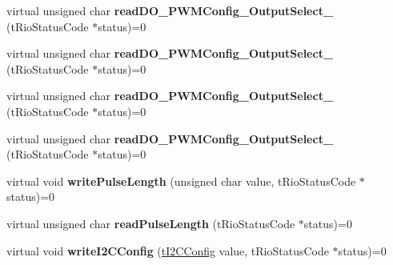\begin{DoxyCompactItemize}
\item 
\hypertarget{classnFPGA_1_1nFRC__2012__1__6__4_1_1tDIO_a1ba4c9385cc16312b5edd0fcf0cf9c97}{
virtual unsigned char {\bfseries readDO\_\-PWMConfig\_\-OutputSelect\_} (tRioStatusCode $\ast$status)=0}
\label{classnFPGA_1_1nFRC__2012__1__6__4_1_1tDIO_a1ba4c9385cc16312b5edd0fcf0cf9c97}

\item 
\hypertarget{classnFPGA_1_1nFRC__2012__1__6__4_1_1tDIO_a85caad19784a1f83f01643685ab0c4ee}{
virtual unsigned char {\bfseries readDO\_\-PWMConfig\_\-OutputSelect\_} (tRioStatusCode $\ast$status)=0}
\label{classnFPGA_1_1nFRC__2012__1__6__4_1_1tDIO_a85caad19784a1f83f01643685ab0c4ee}

\item 
\hypertarget{classnFPGA_1_1nFRC__2012__1__6__4_1_1tDIO_abec0ce72388b63c96df18cddc174aa37}{
virtual unsigned char {\bfseries readDO\_\-PWMConfig\_\-OutputSelect\_} (tRioStatusCode $\ast$status)=0}
\label{classnFPGA_1_1nFRC__2012__1__6__4_1_1tDIO_abec0ce72388b63c96df18cddc174aa37}

\item 
\hypertarget{classnFPGA_1_1nFRC__2012__1__6__4_1_1tDIO_a0653e38b8a28a43b42ad9627c2fc6c3a}{
virtual unsigned char {\bfseries readDO\_\-PWMConfig\_\-OutputSelect\_} (tRioStatusCode $\ast$status)=0}
\label{classnFPGA_1_1nFRC__2012__1__6__4_1_1tDIO_a0653e38b8a28a43b42ad9627c2fc6c3a}

\item 
\hypertarget{classnFPGA_1_1nFRC__2012__1__6__4_1_1tDIO_afb0552677b7031b72cc28c1d1600dab2}{
virtual void {\bfseries writePulseLength} (unsigned char value, tRioStatusCode $\ast$status)=0}
\label{classnFPGA_1_1nFRC__2012__1__6__4_1_1tDIO_afb0552677b7031b72cc28c1d1600dab2}

\item 
\hypertarget{classnFPGA_1_1nFRC__2012__1__6__4_1_1tDIO_a710d1f504174edc2e7e021edf6860d66}{
virtual unsigned char {\bfseries readPulseLength} (tRioStatusCode $\ast$status)=0}
\label{classnFPGA_1_1nFRC__2012__1__6__4_1_1tDIO_a710d1f504174edc2e7e021edf6860d66}

\item 
\hypertarget{classnFPGA_1_1nFRC__2012__1__6__4_1_1tDIO_a5e68eeb281a2202f3d806e53e4a12e17}{
virtual void {\bfseries writeI2CConfig} (\hyperlink{unionnFPGA_1_1nFRC__2012__1__6__4_1_1tDIO_1_1tI2CConfig}{tI2CConfig} value, tRioStatusCode $\ast$status)=0}
\label{classnFPGA_1_1nFRC__2012__1__6__4_1_1tDIO_a5e68eeb281a2202f3d806e53e4a12e17}


\end{DoxyCompactItemize}
